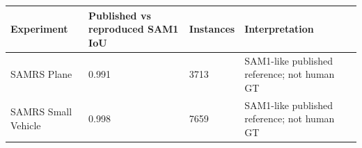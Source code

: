 \begin{tabular}{llll}
\toprule
Experiment & Published vs reproduced SAM1 IoU & Instances & Interpretation \\
\midrule
SAMRS Plane & 0.991 & 3713 & SAM1-like published reference; not human GT \\
SAMRS Small Vehicle & 0.998 & 7659 & SAM1-like published reference; not human GT \\
\bottomrule
\end{tabular}
